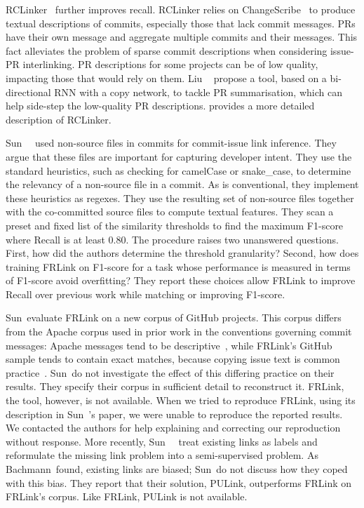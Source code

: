 RCLinker~\cite{RCLinker} further improves recall. RCLinker relies on
ChangeScribe~\cite{ChangeScribe} to produce textual descriptions of commits,
especially those that lack commit messages. PRs have their own message and
aggregate multiple commits and their messages.  
This fact alleviates the problem of sparse commit descriptions when considering
issue-PR interlinking. PR descriptions for some projects can be of low quality,
impacting those that would rely on them. Liu \etal~\cite{liu2019automatic}
propose a tool, based on a bi-directional RNN with a copy network, to tackle PR
summarisation, which can help side-step the low-quality PR descriptions.
 provides a more detailed description of RCLinker.

Sun~\etal~\cite{FRLink} used non-source files in commits for commit-issue link
inference. They argue that these files are important for capturing developer
intent. They use the standard heuristics, such as checking for camelCase or
snake\_case, to determine the relevancy of a non-source file in a commit. As is
conventional, they implement these heuristics as regexes. They use the resulting
set of non-source files together with the co-committed source files to compute
textual features. They scan a preset and fixed list of the similarity thresholds
to find the maximum F1-score where Recall is at least 0.80. The procedure raises
two unanswered questions. First, how did the authors determine the threshold
granularity? Second, how does training FRLink on F1-score for a task whose
performance is measured in terms of F1-score avoid overfitting? They report
these choices allow FRLink to improve Recall over previous work while matching
or improving F1-score. 

Sun~\etal evaluate FRLink on a new corpus of GitHub projects. This corpus
differs from the Apache corpus used in prior work in the conventions governing
commit messages:  Apache messages tend to be descriptive~\cite{ApachePractice},
while FRLink's GitHub sample tends to contain exact matches, because copying
issue text is common practice~\cite{ruan2019deeplink}. Sun~\etal do not
investigate the effect of this differing practice on their results. They specify
their corpus in sufficient detail to reconstruct it. FRLink, the tool, however,
is not available. When we tried to reproduce FRLink, using its description in
Sun~\etal's paper, we were unable to reproduce the reported results.   
We contacted the authors for help explaining and correcting our reproduction
without response. More recently, Sun~\etal~\cite{PULink} treat existing links as
labels and reformulate the missing link problem into a semi-supervised problem.
As Bachmann~\etal found, existing links are biased; Sun~\etal do not discuss how
they coped with this bias. They report that their solution, PULink, outperforms
FRLink on FRLink's corpus. Like FRLink, PULink is not available.

